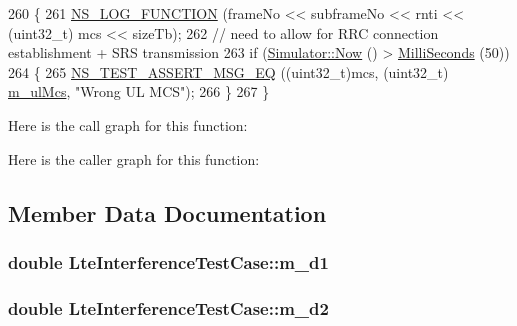 \begin{DoxyCode}
260 \{
261   \hyperlink{log-macros-disabled_8h_a90b90d5bad1f39cb1b64923ea94c0761}{NS\_LOG\_FUNCTION} (frameNo << subframeNo << rnti << (uint32\_t) mcs << sizeTb);
262   \textcolor{comment}{// need to allow for RRC connection establishment + SRS transmission}
263   \textcolor{keywordflow}{if} (\hyperlink{group__simulator_gac3635e2e87f7ce316c89290ee1b01d0d}{Simulator::Now} () > \hyperlink{group__timecivil_gaf26127cf4571146b83a92ee18679c7a9}{MilliSeconds} (50))
264     \{
265       \hyperlink{group__testing_ga2a9d78cffb3db8e867c35fff0b698cf5}{NS\_TEST\_ASSERT\_MSG\_EQ} ((uint32\_t)mcs, (uint32\_t)
      \hyperlink{classLteInterferenceTestCase_ae9b735d97696042105ca16ad0bf9b6fd}{m\_ulMcs}, \textcolor{stringliteral}{"Wrong UL MCS"});
266     \}
267 \}
\end{DoxyCode}


Here is the call graph for this function\+:




Here is the caller graph for this function\+:




\subsection{Member Data Documentation}
\subsubsection[{\texorpdfstring{m\+\_\+d1}{m_d1}}]{\setlength{\rightskip}{0pt plus 5cm}double Lte\+Interference\+Test\+Case\+::m\+\_\+d1\hspace{0.3cm}{\ttfamily [private]}}\hypertarget{classLteInterferenceTestCase_aec093296b82593901f27f359c7d96149}{}\label{classLteInterferenceTestCase_aec093296b82593901f27f359c7d96149}
\subsubsection[{\texorpdfstring{m\+\_\+d2}{m_d2}}]{\setlength{\rightskip}{0pt plus 5cm}double Lte\+Interference\+Test\+Case\+::m\+\_\+d2\hspace{0.3cm}{\ttfamily [private]}}\hypertarget{classLteInterferenceTestCase_ab26ab336e34fbf64b30c89d2d2929ceb}{}\label{classLteInterferenceTestCase_ab26ab336e34fbf64b30c89d2d2929ceb}
